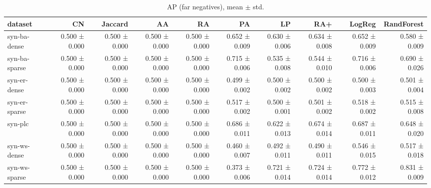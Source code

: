 \begin{table}[t]
\centering
\caption{AP (far negatives), mean $\pm$ std.}
\label{tab:main_ap_far}
\begin{tabular}{lrrrrrrrrr}
\hline
dataset & CN & Jaccard & AA & RA & PA & LP & RA+ & LogReg & RandForest \\
\hline
syn-ba-dense & 0.500 ± 0.000 & 0.500 ± 0.000 & 0.500 ± 0.000 & 0.500 ± 0.000 & 0.652 ± 0.009 & 0.630 ± 0.006 & 0.634 ± 0.008 & 0.652 ± 0.009 & 0.580 ± 0.009 \\
syn-ba-sparse & 0.500 ± 0.000 & 0.500 ± 0.000 & 0.500 ± 0.000 & 0.500 ± 0.000 & 0.715 ± 0.006 & 0.535 ± 0.008 & 0.544 ± 0.010 & 0.716 ± 0.006 & 0.690 ± 0.026 \\
syn-er-dense & 0.500 ± 0.000 & 0.500 ± 0.000 & 0.500 ± 0.000 & 0.500 ± 0.000 & 0.499 ± 0.002 & 0.500 ± 0.002 & 0.500 ± 0.002 & 0.500 ± 0.003 & 0.501 ± 0.004 \\
syn-er-sparse & 0.500 ± 0.000 & 0.500 ± 0.000 & 0.500 ± 0.000 & 0.500 ± 0.000 & 0.517 ± 0.002 & 0.500 ± 0.001 & 0.501 ± 0.002 & 0.518 ± 0.002 & 0.515 ± 0.008 \\
syn-plc & 0.500 ± 0.000 & 0.500 ± 0.000 & 0.500 ± 0.000 & 0.500 ± 0.000 & 0.686 ± 0.011 & 0.622 ± 0.013 & 0.674 ± 0.014 & 0.687 ± 0.011 & 0.648 ± 0.020 \\
syn-ws-dense & 0.500 ± 0.000 & 0.500 ± 0.000 & 0.500 ± 0.000 & 0.500 ± 0.000 & 0.460 ± 0.007 & 0.492 ± 0.011 & 0.490 ± 0.011 & 0.546 ± 0.015 & 0.517 ± 0.018 \\
syn-ws-sparse & 0.500 ± 0.000 & 0.500 ± 0.000 & 0.500 ± 0.000 & 0.500 ± 0.000 & 0.373 ± 0.006 & 0.721 ± 0.014 & 0.724 ± 0.014 & 0.772 ± 0.012 & 0.831 ± 0.009 \\
\hline
\end{tabular}
\end{table}